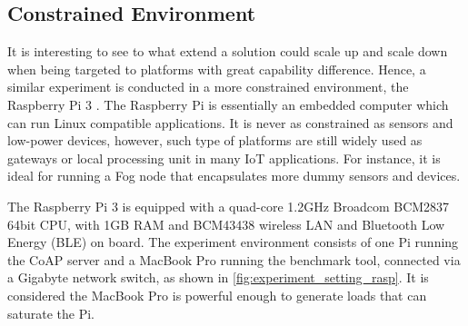 


\subsection{Constrained Environment}

It is interesting to see to what extend a solution could scale up and scale down when being targeted to platforms with great capability difference. Hence, a similar experiment is conducted in a more constrained environment, the Raspberry Pi 3 \autocite{raspberry_pi}. The Raspberry Pi is essentially an embedded computer which can run Linux compatible applications. It is never as constrained as sensors and low-power devices, however, such type of platforms are still widely used as gateways or local processing unit in many IoT applications. For instance, it is ideal for running a Fog node that encapsulates more dummy sensors and devices.

The Raspberry Pi 3 is equipped with a quad-core 1.2GHz Broadcom BCM2837 64bit CPU, with 1GB RAM and BCM43438 wireless LAN and Bluetooth Low Energy (BLE) on board. The experiment environment consists of one Pi running the CoAP server and a MacBook Pro running the benchmark tool, connected via a Gigabyte network switch, as shown in \autoref{fig:experiment_setting_rasp}. It is considered the MacBook Pro is powerful enough to generate loads that can saturate the Pi. 

